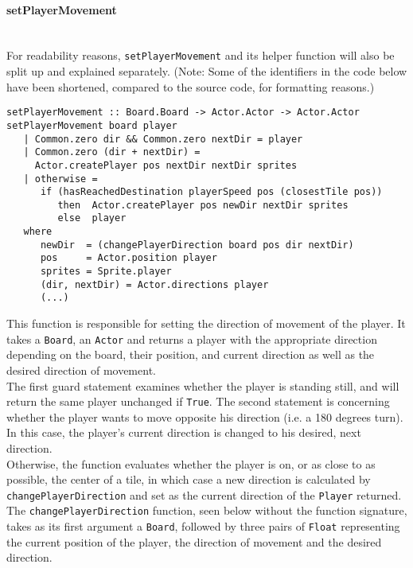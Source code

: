 \documentclass{article}
\begin{document}
		\paragraph{setPlayerMovement}\mbox{} \\
		\newline
		For readability reasons, \texttt{setPlayerMovement} and its helper function will also be split up and explained separately. (Note: Some of the identifiers in the code below have been shortened, compared to the source code, for formatting reasons.)
\begin{verbatim}
setPlayerMovement :: Board.Board -> Actor.Actor -> Actor.Actor
setPlayerMovement board player
   | Common.zero dir && Common.zero nextDir = player
   | Common.zero (dir + nextDir) =
     Actor.createPlayer pos nextDir nextDir sprites
   | otherwise =
      if (hasReachedDestination playerSpeed pos (closestTile pos))
         then  Actor.createPlayer pos newDir nextDir sprites
         else  player
   where
      newDir  = (changePlayerDirection board pos dir nextDir)
      pos     = Actor.position player
      sprites = Sprite.player
      (dir, nextDir) = Actor.directions player
      (...)
\end{verbatim}
		This function is responsible for setting the direction of movement of the player. It takes a \texttt{Board}, an \texttt{Actor} and returns a player with the appropriate direction depending on the board, their position, and current direction as well as the desired direction of movement. \\
		\newline
      The first guard statement examines whether the player is standing still, and will return the same player unchanged if \texttt{True}. The second statement is concerning whether the player wants to move opposite his direction (i.e. a 180 degrees turn). In this case, the player's current direction is changed to his desired, next direction. \\
			\newline
			Otherwise, the function evaluates whether the player is on, or as close to as possible, the center of a tile, in which case a new direction is calculated by \texttt{changePlayerDirection} and set as the current direction of the \texttt{Player} returned.  \\
			\newline
			The \texttt{changePlayerDirection} function, seen below without the function signature, takes as its first argument a \texttt{Board}, followed by three pairs of \texttt{Float} representing the current position of the player, the direction of movement and the desired direction.
\end{document}
